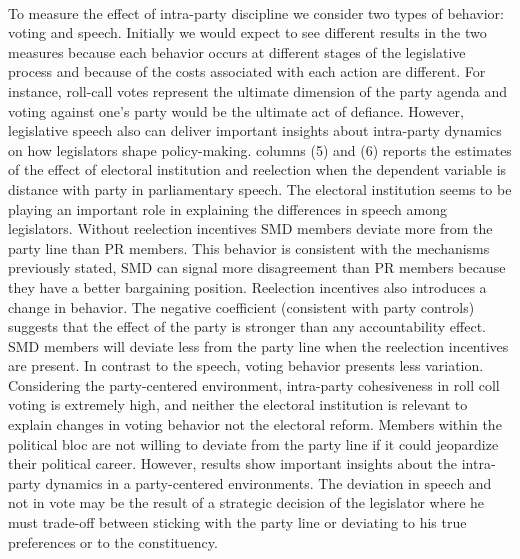 \documentclass{article}
\begin{document}
\\
To measure the effect of intra-party discipline we consider two types of behavior: voting and speech. Initially we would expect to see different results in the two measures because each behavior occurs at different stages of the legislative process and because of the costs associated with each action are different. For instance, roll-call votes represent the ultimate dimension of the party agenda and voting against one's party would be the ultimate act of defiance. However, legislative speech also can deliver important insights about intra-party dynamics on how legislators shape policy-making. columns (5) and (6) reports the estimates of the effect of electoral institution and reelection when the dependent variable is distance with party in parliamentary speech. The electoral institution seems to be playing an important role in explaining the differences in speech among legislators. Without reelection incentives SMD members deviate more from the party line than PR members. This behavior is consistent with the mechanisms previously stated, SMD can signal more disagreement than PR members because they have a better bargaining position. Reelection incentives also introduces a change in behavior. The negative coefficient (consistent with party controls) suggests that the effect of the party is stronger than any accountability effect. SMD members will deviate less from the party line when the reelection incentives are present. In contrast to the speech, voting behavior presents less variation. Considering the party-centered environment, intra-party cohesiveness in roll coll voting is extremely high, and neither the electoral institution is relevant to explain changes in voting behavior not the electoral reform. Members within the political bloc are not willing to deviate from the party line if it could jeopardize their political career. However, results show important insights about the intra-party dynamics in a party-centered environments. The deviation in speech and not in vote may be the result of a strategic decision of the legislator where he must trade-off between sticking with the party line or deviating to his true preferences or to the constituency. \\
\\ 
\end{document}

